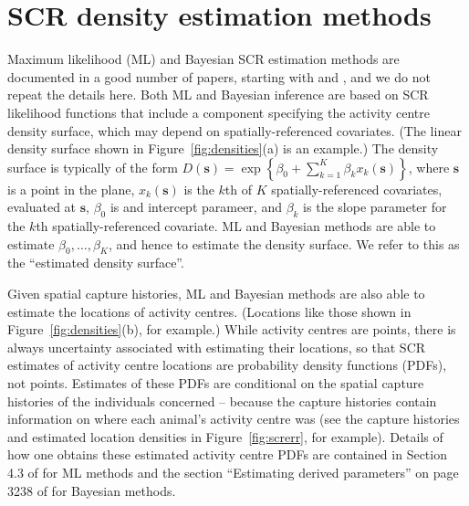 \documentclass[10pt,a4paper]{article}
\begin{document}

\section{SCR density estimation methods}

Maximum likelihood (ML) and Bayesian SCR estimation methods are documented in a good number of papers, starting with \cite{Borchers+Efford:08} and \cite{Royle+Young:08}, and we do not repeat the details here. Both ML and Bayesian inference are based on SCR likelihood functions that include a component specifying the activity centre density surface, which may depend on spatially-referenced covariates. (The linear density surface shown in Figure~\ref{fig:densities}(a) is an example.) The density surface is typically of the form $D(\bm{s})=\exp\left\{\beta_0 + \sum_{k=1}^K\beta_kx_k(\bm{s})\right\}$, where $\bm{s}$ is a point in the plane, $x_k(\bm{s})$ is the $k$th of $K$ spatially-referenced covariates, evaluated at $\bm{s}$, $\beta_0$ is and intercept parameer, and $\beta_k$ is the slope parameter for the $k$th spatially-referenced covariate. ML and Bayesian methods are able to estimate $\beta_0,\ldots,\beta_K$, and hence to estimate the density surface. We refer to this as the ``estimated density surface''.

Given spatial capture histories, ML and Bayesian methods are also able to estimate the locations of activity centres. (Locations like those shown in Figure~\ref{fig:densities}(b), for example.) While activity centres are points, there is always uncertainty associated with estimating their locations, so that SCR estimates of activity centre locations are probability density functions (PDFs), not points. Estimates of these PDFs are conditional on the spatial capture histories of the individuals concerned -- because the capture histories contain information on where each animal's activity centre was (see the capture histories and estimated location densities in Figure~\ref{fig:screrr}, for example). Details of how one obtains these estimated activity centre PDFs are contained in Section 4.3 of \cite{Borchers+Efford:08} for ML methods and the section ``Estimating derived parameters'' on page 3238 of \cite{Royle+al:09b} for Bayesian methods.
\end{document}
